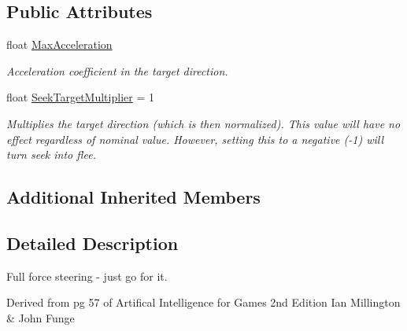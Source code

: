 \subsection*{Public Attributes}
\begin{DoxyCompactItemize}
\item 
float \hyperlink{class_skyrates_1_1_a_i_1_1_steering_1_1_basic_1_1_seek_a9d52531865fdebc48a215c22e654c289}{Max\-Acceleration}
\begin{DoxyCompactList}\small\item\em Acceleration coefficient in the target direction. \end{DoxyCompactList}\item 
float \hyperlink{class_skyrates_1_1_a_i_1_1_steering_1_1_basic_1_1_seek_adc4ddeda4be51c62075cb46acd418ed9}{Seek\-Target\-Multiplier} = 1
\begin{DoxyCompactList}\small\item\em Multiplies the target direction (which is then normalized). This value will have no effect regardless of nominal value. However, setting this to a negative (-\/1) will turn seek into flee. \end{DoxyCompactList}\end{DoxyCompactItemize}
\subsection*{Additional Inherited Members}


\subsection{Detailed Description}
Full force steering -\/ just go for it. 

Derived from pg 57 of Artifical Intelligence for Games 2nd Edition Ian Millington \& John Funge 

